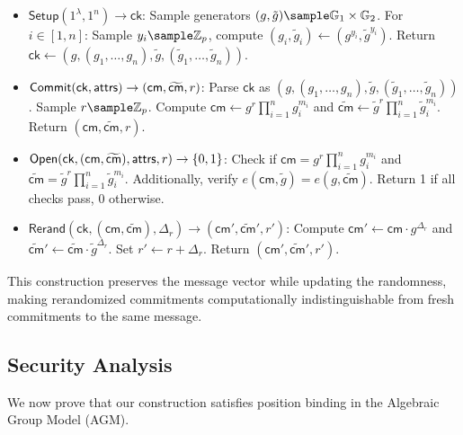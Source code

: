 \begin{itemize}
    \item $\mathsf{Setup}(1^\lambda, 1^n) \to \mathsf{ck}$:
    Sample generators $(g, \tilde{g}) \sample \G_1 \times \G_2$.
    For $i \in [1,n]$: Sample $y_i \sample \Z_p$, compute $(g_i, \tilde{g}_i) \gets (g^{y_i}, \tilde{g}^{y_i})$.
    Return $\mathsf{ck} \gets (g, (g_1,\ldots,g_n), \tilde{g}, (\tilde{g}_1,\ldots,\tilde{g}_n))$.
    
    \item $\mathsf{Commit}(\mathsf{ck}, \mathsf{attrs}) \to (\mathsf{cm}, \widetilde{\mathsf{cm}}, r)$:
    Parse $\mathsf{ck}$ as $(g, (g_1,\ldots,g_n), \tilde{g}, (\tilde{g}_1,\ldots,\tilde{g}_n))$.
    Sample $r \sample \Z_p$.
    Compute $\mathsf{cm} \gets g^r \prod_{i=1}^n g_i^{m_i}$ and $\widetilde{\mathsf{cm}} \gets \tilde{g}^r \prod_{i=1}^n \tilde{g}_i^{m_i}$.
    Return $(\mathsf{cm}, \widetilde{\mathsf{cm}}, r)$.
    
    \item $\mathsf{Open}(\mathsf{ck}, (\mathsf{cm}, \widetilde{\mathsf{cm}}), \mathsf{attrs}, r) \to \{0,1\}$:
    Check if $\mathsf{cm} = g^r \prod_{i=1}^n g_i^{m_i}$ and $\widetilde{\mathsf{cm}} = \tilde{g}^r \prod_{i=1}^n \tilde{g}_i^{m_i}$.
    Additionally, verify $e(\mathsf{cm}, \tilde{g}) = e(g, \widetilde{\mathsf{cm}})$.
    Return 1 if all checks pass, 0 otherwise.
    
    \item $\mathsf{Rerand}(\mathsf{ck}, (\mathsf{cm}, \widetilde{\mathsf{cm}}), \Delta_r) \to ({\mathsf{cm}}', \widetilde{\mathsf{cm}}', r')$:
    Compute ${\mathsf{cm}}' \gets \mathsf{cm} \cdot g^{\Delta_r}$ and $\widetilde{\mathsf{cm}}' \gets \widetilde{\mathsf{cm}} \cdot \tilde{g}^{\Delta_r}$.
    Set $r' \gets r + \Delta_r$.
    Return $({\mathsf{cm}}', \widetilde{\mathsf{cm}}', r')$.
\end{itemize}

This construction preserves the message vector while updating the randomness, making rerandomized commitments computationally indistinguishable from fresh commitments to the same message.


\subsection{Security Analysis}

We now prove that our construction satisfies position binding in the Algebraic Group Model (AGM).

